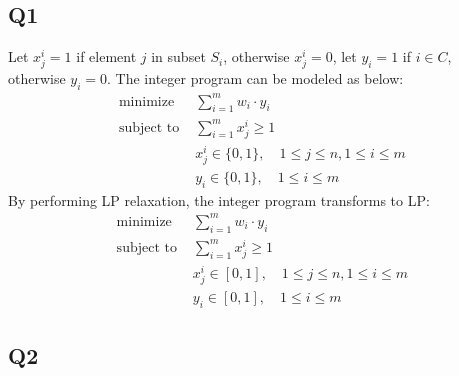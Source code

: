 \documentclass[a4paper, 12pt, titlepage]{article}
\begin{document}
\subsection{Q1}
Let $x_{j}^{i} = 1$ if element $j$ in subset $S_{i}$, otherwise $x_{j}^{i} = 0$, let $y_{i} = 1$ if $i \in C$, otherwise $y_{i} = 0$.
The integer program can be modeled as below:
\begin{equation}
	\begin{aligned}
		\text{ minimize } & \sum_{i = 1}^{m} w_{i} \cdot y_{i} \\ 
		\text{ subject to } & \sum_{i = 1}^{m} x_{j}^{i} \geq 1 \\
		& x_{j}^{i} \in\{0,1\}, \quad 1 \leq j \leq n, 1 \leq i \leq m \\
		& y_{i} \in\{0,1\}, \quad 1 \leq i \leq m
	\end{aligned}
\end{equation}
By performing LP relaxation, the integer program transforms to LP:
\begin{equation}
	\begin{aligned}
		\text{ minimize } & \sum_{i = 1}^{m} w_{i} \cdot y_{i} \\ 
		\text{ subject to } & \sum_{i = 1}^{m} x_{j}^{i} \geq 1 \\
		& x_{j}^{i} \in [0,1], \quad 1 \leq j \leq n, 1 \leq i \leq m \\
		& y_{i} \in [0,1], \quad 1 \leq i \leq m
	\end{aligned}
\end{equation}

\subsection{Q2}
\end{document}
